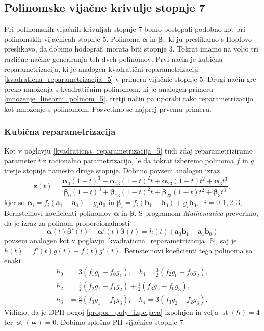 \documentclass[12pt,a4paper,twoside]{article}
\theoremstyle{definition} %
\theoremstyle{plain} %
\theoremstyle{primerstyle}
\numberwithin{equation}{section}  %
\newcommand{\aV}{\mathbf{a}}
\newcommand{\bV}{\mathbf{b}}
\newcommand{\wV}{\mathbf{w}}
\newcommand{\zV}{\mathbf{z}}
\newcommand{\balpha}{\boldsymbol \alpha}
\newcommand{\bbeta}{\boldsymbol \beta}
\DeclareMathOperator{\st}{st}
\begin{document}
\subsection{Polinomske vijačne krivulje stopnje 7}
\label{podpoglavje_vijacne7stopnje}

Pri polinomskih vijačnih krivuljah stopnje 7 bomo postopali podobno kot pri polinomskih vijačnicah stopnje 5. Polinoma $\balpha$ in $\bbeta,$ ki ju preslikamo s Hopfovo preslikavo, da dobimo hodograf, morata biti stopnje 3. Tokrat imamo na voljo tri različne načine generiranja teh dveh polinomov. Prvi način je kubična reparametrizacija, ki je analogen kvadratični reparametrizaciji \ref{kvadraticna_reparametrizacija_5} v primeru vijačnic stopnje 5. Drugi način gre preko množenja s kvadratičnim polinomom, ki je analogen primeru \ref{mnozenje_linearni_polinom_5}, tretji način pa uporabi tako reparametrizacijo kot množenje s polinomom. Posvetimo se najprej prvemu primeru.

\subsubsection{Kubična reparametrizacija}
\label{kubicna_reparametrizacija_7}

Kot v poglavju \ref{kvadraticna_reparametrizacija_5} tudi zdaj reparametriziramo parameter $t$ z racionalno parametrizacijo, le da tokrat izberemo polinoma $f$ in $g$ tretje stopnje namesto druge stopnje. Dobimo povsem analogen izraz
\begin{equation*}
	\zV(t)=\frac{\balpha_0(1-t)^3+\balpha_13(1-t)^2t+\balpha_23(1-t)t^2+\balpha_3t^3}{\bbeta_0(1-t)^3+\bbeta_13(1-t)^2t+\bbeta_23(1-t)t^2+\bbeta_3t^3},
\end{equation*}
kjer so $\balpha_i=f_i(\aV_1-\aV_0)+g_i\aV_0$ in $\bbeta_i=f_i(\bV_1-\bV_0)+g_i\bV_0,\text{ }i=0,1,2,3,$ Bernsteinovi koeficienti polinomov $\balpha$ in $\bbeta.$ S programom \emph{Mathematica} preverimo, da je izraz za polinom proporcionalnosti
\begin{equation*}
	\balpha(t)\bbeta'(t)-\balpha'(t)\bbeta(t)=h(t)(\aV_0\bV_1-\aV_1\bV_0)
\end{equation*}
povsem analogen kot v poglavju \ref{kvadraticna_reparametrizacija_5}, saj je $h(t)=f'(t)g(t)-f(t)g'(t).$ Bernsteinovi koeficienti tega polinoma so enaki
\begin{align}
	h_0&=3(f_1g_0-f_0g_1),\quad h_1=\frac{3}{2}(f_2g_0-f_0g_2),\nonumber\\
	h_2&=\frac{3}{2}(f_2g_1-f_1g_2)+\frac{1}{2}(f_3g_0-f_0g_3),\label{h_coeffs_cubic_repara}\\
	h_3&=\frac{3}{2}(f_3g_1-f_1g_3),\quad h_4=3(f_3g_2-f_2g_3).\nonumber
\end{align}
Vidimo, da je DPH pogoj \eqref{propor_poly_izpeljava} izpolnjen in velja $\st(h)=4$ ter $\st(\wV)=0.$ Dobimo splošno PH vijačnico stopnje 7.
\end{document}
